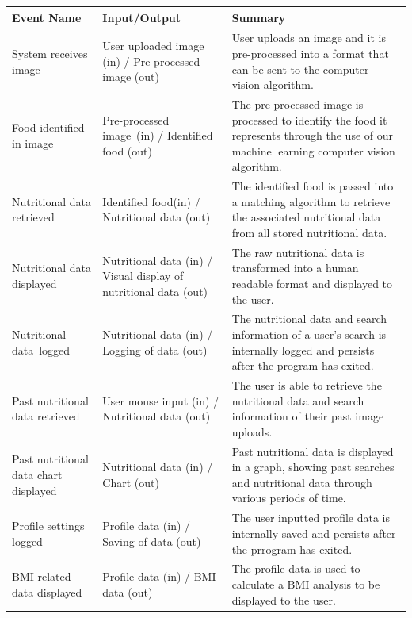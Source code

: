 \documentclass[12pt]{article}
\begin{document}
\begin{tabular}{ |p{5cm}|p{4cm}|p{6.5cm}| }
\hline
\textbf{Event Name}                   & \textbf{Input/Output}                                            & \textbf{Summary}                                                                                                                            \\ 
\hline
System receives image                 & User uploaded image (in) / Pre-processed image (out)             & User uploads an image and it is pre-processed into a format that can be sent to the computer vision algorithm.                              \\ 
\hline
Food identified in image              & Pre-processed image~(in) / Identified food (out)                 & The pre-processed image is processed to identify the food it represents through the use of our machine learning computer vision algorithm.  \\ 
\hline
Nutritional data retrieved            & Identified food(in) / Nutritional data (out)                     & The identified food is passed into a matching algorithm to retrieve the associated nutritional data from all stored nutritional data.       \\ 
\hline
Nutritional data displayed            & Nutritional data (in) / Visual display of nutritional data (out) & The raw nutritional data is transformed into a human readable format and displayed to the user.                                             \\ 
\hline
Nutritional data~logged               & Nutritional data (in) / Logging of data (out)                    & The nutritional data and search information of a user's search is internally logged and persists after the program has exited.              \\ 
\hline
Past nutritional data retrieved       & User mouse input (in) / Nutritional data (out)                   & The user is able to retrieve the nutritional data and search information of their past image uploads.                                       \\ 
\hline
Past nutritional data chart displayed & Nutritional data (in) / Chart (out)                              & Past nutritional data is displayed in a graph, showing past searches and nutritional data through various periods of time.                  \\
\hline
Profile settings logged & Profile data (in) / Saving of data (out)                              & The user inputted profile data is internally saved and persists after the prrogram has exited.                  \\
\hline
BMI related data displayed & Profile data (in) / BMI data (out)                              & The profile data is used to calculate a BMI analysis to be displayed to the user.                  \\
\hline
\end{tabular}
\end{document}
